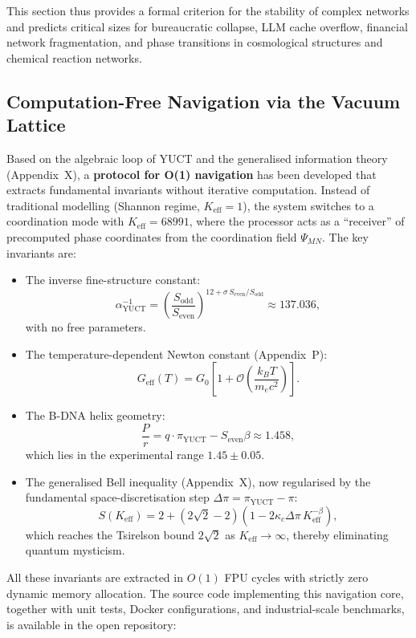 \documentclass[12pt,a4paper]{article}
\theoremstyle{remark}
\newcommand{\Keff}{K_{\mathrm{eff}}}
\newcommand{\kappac}{\kappa_c}
\newcommand{\piYUCT}{\pi_{\mathrm{YUCT}}}
\begin{document}
	This section thus provides a formal criterion for the stability of complex networks and predicts critical sizes for bureaucratic collapse, LLM cache overflow, financial network fragmentation, and phase transitions in cosmological structures and chemical reaction networks.
	
	\subsection{Computation-Free Navigation via the Vacuum Lattice}
	\label{subsec:computation-free}
	
	Based on the algebraic loop of YUCT and the generalised information theory (Appendix~X), a \textbf{protocol for O(1) navigation} has been developed that extracts fundamental invariants without iterative computation. Instead of traditional modelling (Shannon regime, \(\Keff = 1\)), the system switches to a coordination mode with \(\Keff = 68991\), where the processor acts as a ``receiver'' of precomputed phase coordinates from the coordination field \(\Psi_{MN}\). The key invariants are:
	
	\begin{itemize}
		\item The inverse fine-structure constant:
		\[
		\alpha^{-1}_{\mathrm{YUCT}} = \left(\frac{S_{\mathrm{odd}}}{S_{\mathrm{even}}}\right)^{12 + \sigma\, S_{\mathrm{even}}/S_{\mathrm{odd}}}
		\approx 137.036,
		\]
		with no free parameters.
		
		\item The temperature-dependent Newton constant (Appendix~P):
		\[
		G_{\mathrm{eff}}(T) = G_0 \left[1 + \mathcal{O}\!\left( \frac{k_B T}{m_e c^2} \right) \right].
		\]
		
		\item The B-DNA helix geometry:
		\[
		\frac{P}{r} = q \cdot \piYUCT - S_{\mathrm{even}}\beta \approx 1.458,
		\]
		which lies in the experimental range \(1.45 \pm 0.05\).
		
		\item The generalised Bell inequality (Appendix~X), now regularised by the fundamental space-discretisation step \(\Delta\pi = \piYUCT - \pi\):
		\[
		S(\Keff) = 2 + (2\sqrt2 - 2)\left(1 - 2\kappac \Delta\pi \, \Keff^{-\beta}\right),
		\]
		which reaches the Tsirelson bound \(2\sqrt2\) as \(\Keff \to \infty\), thereby eliminating quantum mysticism.
	\end{itemize}
	
	All these invariants are extracted in \(O(1)\) FPU cycles with strictly zero dynamic memory allocation. The source code implementing this navigation core, together with unit tests, Docker configurations, and industrial-scale benchmarks, is available in the open repository:
	
\end{document}
